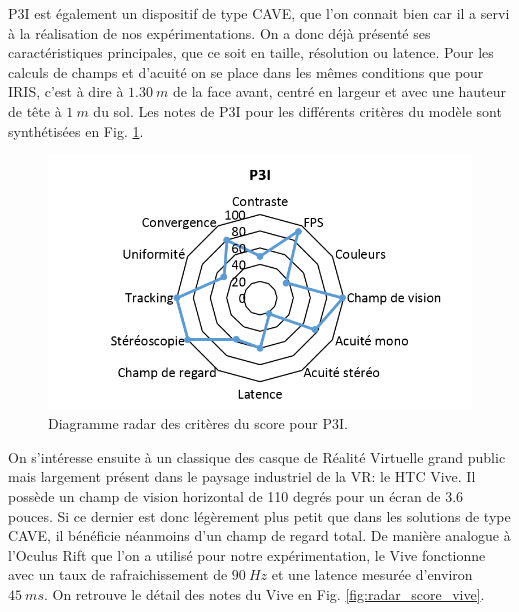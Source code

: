 \par P3I est également un dispositif de type CAVE, que l'on connait bien car il a servi à la réalisation de nos expérimentations. On a donc déjà présenté ses caractéristiques principales, que ce soit en taille, résolution ou latence. Pour les calculs de champs et d'acuité on se place dans les mêmes conditions que pour IRIS, c'est à dire à $1.30~m$ de la face avant, centré en largeur et avec une hauteur de tête à $1~m$ du sol. Les notes de P3I pour les différents critères du modèle sont synthétisées en Fig. \ref{fig:radar_score_p3i}.

\begin{figure}
	\centering
	\includegraphics[scale=1]{Figures/RadarScoreP3I}
	\caption{Diagramme radar des critères du score pour P3I.}
	\label{fig:radar_score_p3i}
\end{figure}

\par On s'intéresse ensuite à un classique des casque de Réalité Virtuelle grand public mais largement présent dans le paysage industriel de la VR: le HTC Vive. Il possède un champ de vision horizontal de 110 degrés pour un écran de 3.6 pouces. Si ce dernier est donc légèrement plus petit que dans les solutions de type CAVE, il bénéficie néanmoins d'un champ de regard total. De manière analogue à l'Oculus Rift que l'on a utilisé pour notre expérimentation, le Vive fonctionne avec un taux de rafraichissement de $90~Hz$ et une latence mesurée d'environ $45~ms$. On retrouve le détail des notes du Vive en Fig. \ref{fig:radar_score_vive}.

